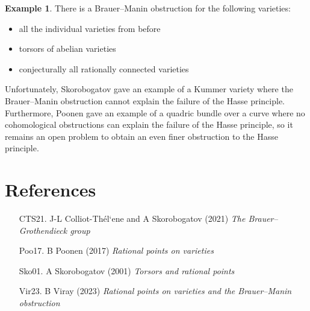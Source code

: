 \documentclass{article}
\theoremstyle{plain}
\theoremstyle{definition}
\newtheorem*{example}{Example}
\begin{document}
\begin{example}
There is a Brauer--Manin obstruction for the following varieties:
\begin{itemize}
\item all the individual varieties from before
\item torsors of abelian varieties
\item conjecturally all rationally connected varieties
\end{itemize}
\end{example}

Unfortunately, Skorobogatov gave an example of a Kummer variety where the Brauer--Manin obstruction cannot explain the failure of the Hasse principle. Furthermore, Poonen gave an example of a quadric bundle over a curve where no cohomological obstructions can explain the failure of the Hasse principle, so it remains an open problem to obtain an even finer obstruction to the Hasse principle.

\section*{References}

\begin{itemize}
\item[CTS21.] J-L Colliot-Th\'el`ene and A Skorobogatov (2021) \emph{The Brauer--Grothendieck group}
\item[Poo17.] B Poonen (2017) \emph{Rational points on varieties}
\item[Sko01.] A Skorobogatov (2001) \emph{Torsors and rational points}
\item[Vir23.] B Viray (2023) \emph{Rational points on varieties and the Brauer--Manin obstruction}
\end{itemize}
\end{document}
